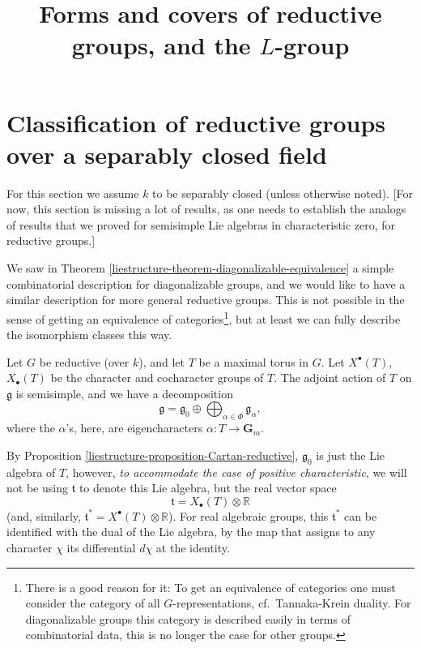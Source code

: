 

%


\title{Forms and covers of reductive groups, and the $L$-group}


\maketitle

\label{section-phantom}

\tableofcontents



\section{Classification of reductive groups over a separably closed field}
\label{section-classification-reductive}


For this section we assume $k$ to be separably closed (unless otherwise noted). [For now, this section is missing a lot of results, as one needs to establish the analogs of results that we proved for semisimple Lie algebras in characteristic zero, for reductive groups.]

We saw in Theorem \ref{liestructure-theorem-diagonalizable-equivalence} a simple combinatorial description for diagonalizable groups, and we would like to have a similar description for more general reductive groups. This is not possible in the sense of getting an equivalence of categories\footnote{There is a good reason for it: To get an equivalence of categories one must consider the category of all $G$-representations, cf.\ Tannaka-Krein duality. For diagonalizable groups this category is described easily in terms of combinatorial data, this is no longer the case for other groups.}, but at least we can fully describe the isomorphism classes this way.


Let $G$ be reductive (over $k$), and let $T$ be a maximal torus in $G$. Let $X^\bullet(T)$, $X_\bullet(T)$ be the character and cocharacter groups of $T$. The adjoint action of $T$ on $\mathfrak g$ is semisimple, and we have a decomposition 
$$\mathfrak g = \mathfrak g_0 \oplus \bigoplus_{\alpha\in\Phi} \mathfrak g_\alpha,$$
where the $\alpha$'s, here, are eigencharacters $\alpha: T\to \mathbf G_m$. 

By Proposition \ref{liestructure-proposition-Cartan-reductive}, $\mathfrak g_0$ is just the Lie algebra of $T$, however, \emph{to accommodate the case of positive characteristic}, we will not be using $\mathfrak t$ to denote this Lie algebra, but the real vector space
$$ \mathfrak t = X_\bullet(T)\otimes \mathbb R$$
(and, similarly, $\mathfrak t^*= X^\bullet(T)\otimes \mathbb R$). For real algebraic groups, this $\mathfrak t^*$ can be identified with the dual of the Lie algebra,  by the map that assigns to any character $\chi$ its differential $d\chi$ at the identity. 

